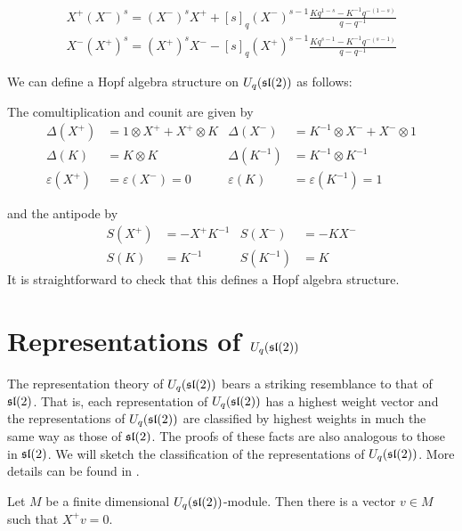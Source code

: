 \begin{align}
    \label{EFrelations}
     X^+ (X^-)^s = (X^-)^s X^+  + [s]_q (X^-)^{s-1} \frac{Kq^{1-s} - K^{-1} q^{-(1-s)}}{q-q^{-1}} \\
    X^- (X^+)^s =  (X^+)^sX^- - [s]_q  (X^+)^{s-1} \frac{Kq^{s-1} - K^{-1} q^{-(s-1)}}{q-q^{-1}}
\end{align}

We can define a Hopf algebra structure on $U_q(\mathfrak{sl}(2))$ as follows:

The comultiplication and counit are given by
\begin{align}
    \Delta(X^+) &= 1 \otimes  X^+  +  X^+  \otimes K &  \Delta(X^-) &= K^{-1} \otimes X^- + X^- \otimes 1 \\
    \Delta(K) &= K \otimes K &  \Delta(K^{-1}) &= K^{-1} \otimes K^{-1}\\ 
    \varepsilon( X^+ ) &= \varepsilon(X^-) = 0 &  \varepsilon(K) &= \varepsilon(K^{-1}) = 1
\end{align}

and the antipode by
\begin{align}
    S(X^+) &= - X^+ K^{-1} & S(X^-)      &= -KX^- \\
    S(K) &= K^{-1}   & S(K^{-1}) &= K 
\end{align}
It is straightforward to check that this defines a Hopf algebra structure. 

\section{Representations of $U_q(\mathfrak{sl}(2))$}

The representation theory of $U_q(\mathfrak{sl}(2))$ bears a striking resemblance to
that of $\mathfrak{sl}(2)$. That is, each representation of $U_q(\mathfrak{sl}(2))$ has a highest
weight vector and the representations of $U_q(\mathfrak{sl}(2))$ are classified by
highest weights in much the same way as those of $\mathfrak{sl}(2)$. The proofs of these
facts are also analogous to those in $\mathfrak{sl}(2)$. We will sketch the
classification of the representations of $U_q(\mathfrak{sl}(2))$. More details can be
found in \cite{Jantzen1996}.


\begin{claim}
    Let $M$ be a finite dimensional $U_q(\mathfrak{sl}(2))$-module. Then there is a
    vector $v \in M$ such that $ X^+ v = 0$. 
\end{claim}


